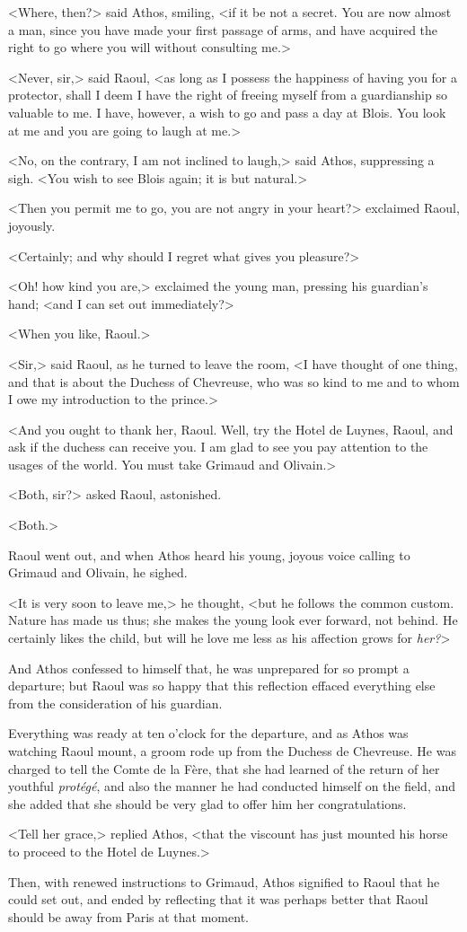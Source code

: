 <Where, then?> said Athos, smiling, <if it be not a secret. You are now almost a man, since you have made your first passage of arms, and have acquired the right to go where you will without consulting me.>

<Never, sir,> said Raoul, <as long as I possess the happiness of having you for a protector, shall I deem I have the right of freeing myself from a guardianship so valuable to me. I have, however, a wish to go and pass a day at Blois. You look at me and you are going to laugh at me.>

<No, on the contrary, I am not inclined to laugh,> said Athos, suppressing a sigh. <You wish to see Blois again; it is but natural.>

<Then you permit me to go, you are not angry in your heart?> exclaimed Raoul, joyously.

<Certainly; and why should I regret what gives you pleasure?>

<Oh! how kind you are,> exclaimed the young man, pressing his guardian's hand; <and I can set out immediately?>

<When you like, Raoul.>

<Sir,> said Raoul, as he turned to leave the room, <I have thought of one thing, and that is about the Duchess of Chevreuse, who was so kind to me and to whom I owe my introduction to the prince.>

<And you ought to thank her, Raoul. Well, try the Hotel de Luynes, Raoul, and ask if the duchess can receive you. I am glad to see you pay attention to the usages of the world. You must take Grimaud and Olivain.>

<Both, sir?> asked Raoul, astonished.

<Both.>

Raoul went out, and when Athos heard his young, joyous voice calling to Grimaud and Olivain, he sighed.

<It is very soon to leave me,> he thought, <but he follows the common custom. Nature has made us thus; she makes the young look ever forward, not behind. He certainly likes the child, but will he love me less as his affection grows for \textit{her?}>

And Athos confessed to himself that, he was unprepared for so prompt a departure; but Raoul was so happy that this reflection effaced everything else from the consideration of his guardian.

Everything was ready at ten o'clock for the departure, and as Athos was watching Raoul mount, a groom rode up from the Duchess de Chevreuse. He was charged to tell the Comte de la Fère, that she had learned of the return of her youthful \textit{protégé}, and also the manner he had conducted himself on the field, and she added that she should be very glad to offer him her congratulations.

<Tell her grace,> replied Athos, <that the viscount has just mounted his horse to proceed to the Hotel de Luynes.>

Then, with renewed instructions to Grimaud, Athos signified to Raoul that he could set out, and ended by reflecting that it was perhaps better that Raoul should be away from Paris at that moment. 